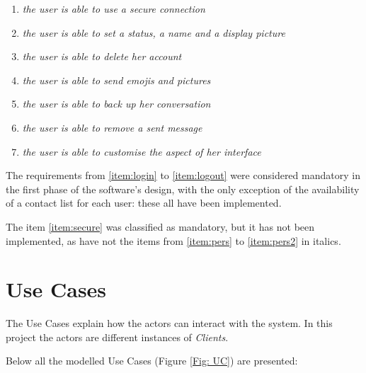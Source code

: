\documentclass[finalReport.tex]{subfiles}
\begin{document}
\begin{enumerate}[label=(\alph*)]
\item \textit{the user is able to use a secure connection}\label{item:secure}
\item \textit{the user is able to set a status, a name and a display picture}\label{item:pers}
\item \textit{the user is able to delete her account}
\item \textit{the user is able to send emojis and pictures}
\item \textit{the user is able to back up her conversation}
\item \textit{the user is able to remove a sent message}
\item \textit{the user is able to customise the aspect of her interface}\label{item:pers2}

\end{enumerate}

The requirements from \ref{item:login} to \ref{item:logout} were considered mandatory in the first phase of the software's design, with the only exception of the availability of a contact list for each user: these all have been implemented.
  
The item \ref{item:secure} was classified as mandatory, but it has not been implemented, as have not the items from \ref{item:pers} to \ref{item:pers2} in italics. 





\section{Use Cases}\label{sec_UC} 
The Use Cases explain how the actors can interact with the system. In this project the actors are different instances of \textit{Clients}.

Below all the modelled Use Cases (Figure \ref{Fig: UC}) are presented:
\end{document}
